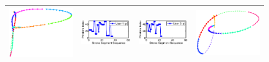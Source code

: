 \begin{figure}[!bhp]
\begin{tabular}{|cc|cc|}
{\includegraphics[width=.3\columnwidth]{./Graphic/Pic_words_forSystemSection/user_2_bphmn_2_at_4th_component.eps} }
&{\includegraphics[width=.55\columnwidth]{./Graphic/Pic_words_forSystemSection/user1_p.eps} }%
&{\includegraphics[width=.55\columnwidth]{./Graphic/Pic_words_forSystemSection/user2_p.eps}}
&{\includegraphics[width=.3\columnwidth]{./Graphic/Pic_words_forSystemSection/user_1_bphmn_2_at_8th_component.eps}} 
 \\ \hline 
%
%
%

\end{tabular}
\end{figure}
